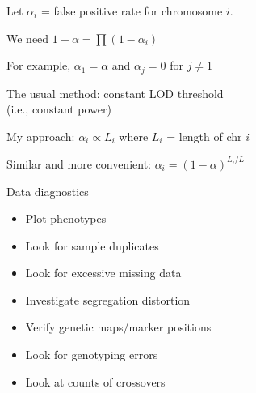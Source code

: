 \documentclass[12pt]{article}
\newcommand{\headsize}{\fontsize{35}{35} \selectfont}
\newcommand{\smallsize}{\fontsize{25}{30} \selectfont}
\begin{document}
\hspace{0.5in} \begin{minipage}[t]{9.5in}
Let {\color{myblue} $\alpha_i$} = false positive rate for chromosome $i$.

\bigskip

We need {\color{myblue} $1 - \alpha = \prod (1 - \alpha_i)$}

\bigskip \bigskip \bigskip

For example,  {\color{myblue} $\alpha_1 = \alpha$ {\color{mywhite} and} $\alpha_j = 0$
  for $j \ne 1$}

\bigskip \bigskip \bigskip

The usual method: {\color{mypink} constant LOD threshold} \\
\hspace*{3in} {\color{myblue} (i.e., constant power)}

\bigskip \bigskip \bigskip

{\color{myyellow} My approach: \hspace{1cm} $\alpha_i \propto L_i$}
\hspace{1cm} where $L_i$ = length of chr $i$

\bigskip \bigskip

\hspace*{1.5in} {\color{myblue} Similar and more convenient:  $\alpha_i = (1-\alpha)^{L_i/L}$}
\end{minipage}



\newpage

\headsize \color{myyellow}
\hfill \begin{minipage}{5.75in}
\centering
Data diagnostics
\end{minipage}

\vspace{3cm}

\color{mywhite} \smallsize

\hfill \begin{minipage}[t]{9.5in}
\begin{itemize}
\itemsep18pt
\item Plot phenotypes
\item Look for sample duplicates
\item Look for excessive missing data
\item Investigate segregation distortion
\item Verify genetic maps/marker positions
\item Look for genotyping errors
\item Look at counts of crossovers
\end{itemize} \end{minipage}
\end{document}
